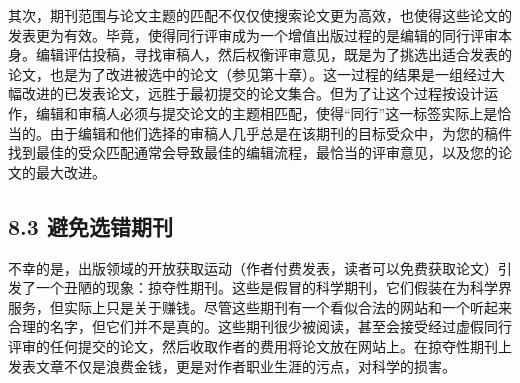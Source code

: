 其次，期刊范围与论文主题的匹配不仅仅使搜索论文更为高效，也使得这些论文的发表更为有效。毕竟，使得同行评审成为一个增值出版过程的是编辑的同行评审本身。编辑评估投稿，寻找审稿人，然后权衡评审意见，既是为了挑选出适合发表的论文，也是为了改进被选中的论文（参见第十章）。这一过程的结果是一组经过大幅改进的已发表论文，远胜于最初提交的论文集合。但为了让这个过程按设计运作，编辑和审稿人必须与提交论文的主题相匹配，使得“同行”这一标签实际上是恰当的。由于编辑和他们选择的审稿人几乎总是在该期刊的目标受众中，为您的稿件找到最佳的受众匹配通常会导致最佳的编辑流程，最恰当的评审意见，以及您的论文的最大改进。

\subsection*{8.3 避免选错期刊}
不幸的是，出版领域的开放获取运动（作者付费发表，读者可以免费获取论文）引发了一个丑陋的现象：掠夺性期刊。这些是假冒的科学期刊，它们假装在为科学界服务，但实际上只是关于赚钱。尽管这些期刊有一个看似合法的网站和一个听起来合理的名字，但它们并不是真的。这些期刊很少被阅读，甚至会接受经过虚假同行评审的任何提交的论文，然后收取作者的费用将论文放在网站上。在掠夺性期刊上发表文章不仅是浪费金钱，更是对作者职业生涯的污点，对科学的损害。

